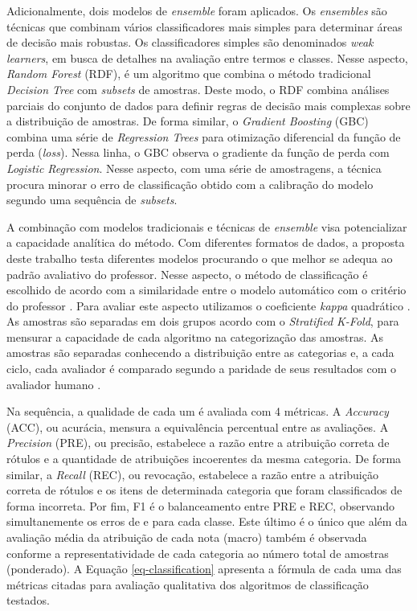 Adicionalmente, dois modelos de \textit{ensemble} foram aplicados. Os \textit{ensembles} são técnicas que combinam vários classificadores mais simples para determinar áreas de decisão mais robustas. Os classificadores simples são denominados \textit{weak learners}, em busca de detalhes na avaliação entre termos e classes. Nesse aspecto, \textit{Random Forest} (RDF), é um algoritmo que combina o método tradicional \textit{Decision Tree} com \textit{subsets} de amostras. Deste modo, o RDF combina análises parciais do conjunto de dados para definir regras de decisão mais complexas sobre a distribuição de amostras. De forma similar, o \textit{Gradient Boosting} (GBC) combina uma série de \textit{Regression Trees} para otimização diferencial da função de perda (\textit{loss}). Nessa linha, o GBC observa o gradiente da função de perda com \textit{Logistic Regression}. Nesse aspecto, com uma série de amostragens, a técnica procura minorar o erro de classificação obtido com a calibração do modelo segundo uma sequência de \textit{subsets}. 

A combinação com modelos tradicionais e técnicas de \textit{ensemble} visa potencializar a capacidade analítica do método. Com diferentes formatos de dados, a proposta deste trabalho testa diferentes modelos procurando o que melhor se adequa ao padrão avaliativo do professor. Nesse aspecto, o método de classificação é escolhido de acordo com a similaridade entre o modelo automático com o critério do professor \cite{pado2021}. Para avaliar este aspecto utilizamos o coeficiente \textit{kappa} quadrático \cite{cohen1960}. As amostras são separadas em dois grupos acordo com o \textit{Stratified K-Fold}, para mensurar a capacidade de cada algoritmo na categorização das amostras. As amostras são separadas conhecendo a distribuição entre as categorias e, a cada ciclo, cada avaliador é comparado segundo a paridade de seus resultados com o avaliador humano \cite{artstein2008}.

Na sequência, a qualidade de cada um é avaliada com 4 métricas. A \textit{Accuracy} (ACC), ou acurácia, mensura a equivalência percentual entre as avaliações. A \textit{Precision} (PRE), ou precisão, estabelece a razão entre a atribuição correta de rótulos e a quantidade de atribuições incoerentes da mesma categoria. De forma similar, a \textit{Recall} (REC), ou revocação, estabelece a razão entre a atribuição correta de rótulos e os itens de determinada categoria que foram classificados de forma incorreta. Por fim, F1 é o balanceamento entre PRE e REC, observando simultanemente os erros de e para cada classe. Este último é o único que além da avaliação média da atribuição de cada nota (macro) também é observada conforme a representatividade de cada categoria ao número total de amostras (ponderado). A Equação \ref{eq-classification} apresenta a fórmula de cada uma das métricas citadas para avaliação qualitativa dos algoritmos de classificação testados.


